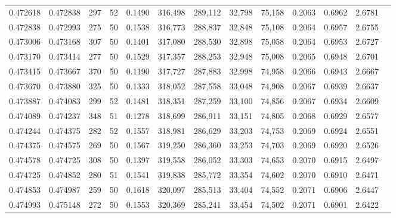 \begin{tabular}{rrrrrrrrrrrrr}
0.472618 & 0.472838 &   297 &  52 &                                     0.1490 & 316,498 & 289,112 &  32,798 &  75,158 & 0.2063 & 0.6962 & 2.6781 \\
0.472838 & 0.472993 &   275 &  50 &                                     0.1538 & 316,773 & 288,837 &  32,848 &  75,108 & 0.2064 & 0.6957 & 2.6755 \\
0.473006 & 0.473168 &   307 &  50 &                                     0.1401 & 317,080 & 288,530 &  32,898 &  75,058 & 0.2064 & 0.6953 & 2.6727 \\
0.473170 & 0.473414 &   277 &  50 &                                     0.1529 & 317,357 & 288,253 &  32,948 &  75,008 & 0.2065 & 0.6948 & 2.6701 \\
0.473415 & 0.473667 &   370 &  50 &                                     0.1190 & 317,727 & 287,883 &  32,998 &  74,958 & 0.2066 & 0.6943 & 2.6667 \\
0.473670 & 0.473880 &   325 &  50 &                                     0.1333 & 318,052 & 287,558 &  33,048 &  74,908 & 0.2067 & 0.6939 & 2.6637 \\
0.473887 & 0.474083 &   299 &  52 &                                     0.1481 & 318,351 & 287,259 &  33,100 &  74,856 & 0.2067 & 0.6934 & 2.6609 \\
0.474089 & 0.474237 &   348 &  51 &                                     0.1278 & 318,699 & 286,911 &  33,151 &  74,805 & 0.2068 & 0.6929 & 2.6577 \\
0.474244 & 0.474375 &   282 &  52 &                                     0.1557 & 318,981 & 286,629 &  33,203 &  74,753 & 0.2069 & 0.6924 & 2.6551 \\
0.474375 & 0.474575 &   269 &  50 &                                     0.1567 & 319,250 & 286,360 &  33,253 &  74,703 & 0.2069 & 0.6920 & 2.6526 \\
0.474578 & 0.474725 &   308 &  50 &                                     0.1397 & 319,558 & 286,052 &  33,303 &  74,653 & 0.2070 & 0.6915 & 2.6497 \\
0.474725 & 0.474852 &   280 &  51 &                                     0.1541 & 319,838 & 285,772 &  33,354 &  74,602 & 0.2070 & 0.6910 & 2.6471 \\
0.474853 & 0.474987 &   259 &  50 &                                     0.1618 & 320,097 & 285,513 &  33,404 &  74,552 & 0.2071 & 0.6906 & 2.6447 \\
0.474993 & 0.475148 &   272 &  50 &                                     0.1553 & 320,369 & 285,241 &  33,454 &  74,502 & 0.2071 & 0.6901 & 2.6422 \\

\end{tabular}
